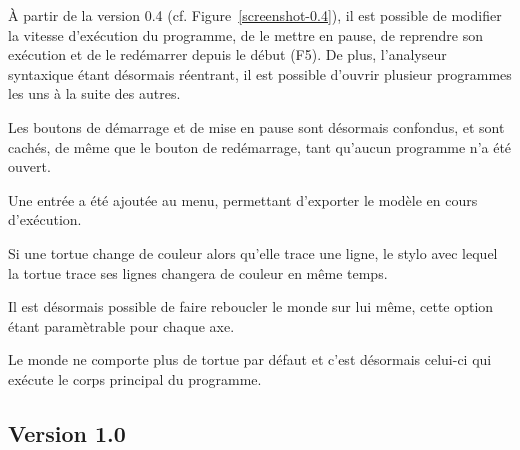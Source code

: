À partir de la version 0.4 (cf. Figure~\ref{screenshot-0.4}), il est possible de modifier la vitesse d'exécution du programme, de le mettre en pause, de reprendre son exécution et de le redémarrer depuis le début (F5). De plus, l'analyseur syntaxique étant désormais réentrant, il est possible d'ouvrir plusieur programmes les uns à la suite des autres.

Les boutons de démarrage et de mise en pause sont désormais confondus, et sont cachés, de même que le bouton de redémarrage, tant qu'aucun programme n'a été ouvert.

Une entrée a été ajoutée au menu, permettant d'exporter le modèle en cours d'exécution.

Si une tortue change de couleur alors qu'elle trace une ligne, le stylo avec lequel la tortue trace ses lignes changera de couleur en même temps.

Il est désormais possible de faire reboucler le monde sur lui même, cette option étant paramètrable pour chaque axe.

Le monde ne comporte plus de tortue par défaut et c'est désormais celui-ci qui exécute le corps principal du programme.

\subsection{Version 1.0}

